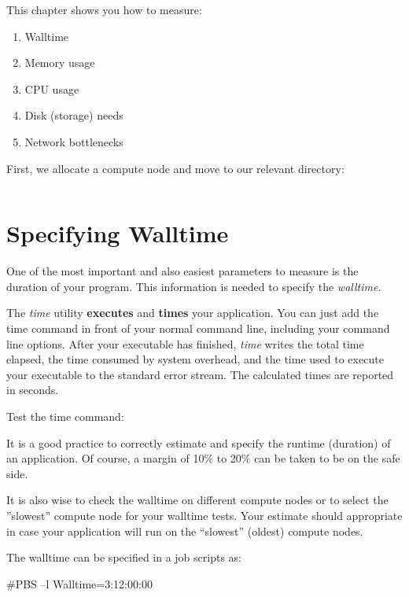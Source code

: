 This chapter shows you how to measure:

\begin{enumerate}
\item  Walltime
\item  Memory usage
\item  CPU usage
\item  Disk (storage) needs
\item  Network bottlenecks
\end{enumerate}

First, we allocate a compute node and move to our relevant directory:
\begin{prompt}
$ %
$ %
\end{prompt}

\section{Specifying Walltime}

One of the most important and also easiest parameters to measure is the duration of your program. This information is needed to specify the \textit{walltime}.

The \textit{time} utility \textbf{executes} and \textbf{times} your application.  You can just add the time command in front of your normal command line, including your command line options. After your executable has finished, \textit{time} writes the total time elapsed, the time consumed by system overhead, and the time used to execute your executable to the standard error stream.  The calculated times are reported in seconds.


Test the time command:

It is a good practice to correctly estimate and specify the runtime (duration) of an application. Of course, a margin of 10\% to 20\% can be taken to be on the safe side.

It is also wise to check the walltime on different compute nodes or to select the ''slowest'' compute node for your walltime tests. Your estimate should appropriate in case your application will run on the ``slowest'' (oldest) compute nodes.

The walltime can be specified in a job scripts as:
\begin{prog}
\#PBS --l Walltime=3:12:00:00
\end{prog}

